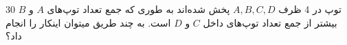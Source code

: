 30 توپ در 4 ظرف $A, B, C, D$ پخش شده‌اند به طوری که جمع تعداد توپ‌های $A$ و $B$ بیشتر از
جمع تعداد توپ‌های داخل $C$ و $D$ است. 
به چند طریق میتوان اینکار را انجام داد؟